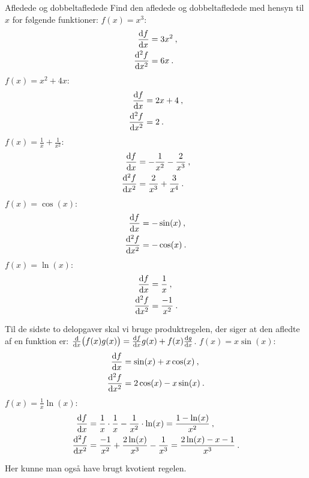 \begin{opgave}[1]{Afledede og dobbeltafledede}
Find den afledede og dobbeltafledede med hensyn til $x$ for følgende funktioner:
\opg $f(x) = x^3$:
    \begin{align*}
        \dv{f}{x}&=3x^2 \: , \\
        \dv[2]{f}{x}&=6x \: .
    \end{align*}
\opg $f(x) = x^2 + 4x$:
    \begin{align*}
        \dv{f}{x}&=2x+4 \: ,\\
        \dv[2]{f}{x}&=2 \: .
    \end{align*}
\opg $f(x) = \frac{1}{x} + \frac{1}{x^2}$:
    \begin{align*}
        \dv{f}{x}&=-\frac{1}{x^2}-\frac{2}{x^3} \: , \\
        \dv[2]{f}{x}&=\frac{2}{x^3}+\frac{3}{x^4} \: .
    \end{align*}
\opg $f(x) = \cos(x)$:
    \begin{align*}
        \dv{f}{x}&=-\sin(x) \: , \\
        \dv[2]{f}{x}&= -\cos(x) \: .
    \end{align*}
\opg $f(x) = \ln(x)$:
    \begin{align*}
        \dv{f}{x}&=\frac{1}{x} \: , \\
        \dv[2]{f}{x}&=\frac{-1}{x^2} \: .
    \end{align*}

Til de sidste to delopgaver skal vi bruge produktregelen, der siger at den afledte af en funktion er: $\dv{}{x}\big(f(x)g(x)\big)=\dv{f}{x}g(x)+f(x)\dv{g}{x}$.
\opg $f(x) = x \sin(x)$:
    \begin{align*}
        \dv{f}{x}&=\sin(x)+x\cos(x) \: , \\
        \dv[2]{f}{x}&=2\cos(x)-x\sin(x) \: .
    \end{align*}
\opg $f(x) = \frac{1}{x} \ln(x)$:
    \begin{align*}
        \dv{f}{x}&=\frac{1}{x}\cdot \frac{1}{x}-\frac{1}{x^2}\cdot \ln(x)=\frac{1-\ln(x)}{x^2} \: , \\
        \dv[2]{f}{x}&=\frac{-1}{x^2}+\frac{2\ln(x)}{x^3}-\frac{1}{x^3}=\frac{2\ln(x)-x-1}{x^3} \: .
    \end{align*}

Her kunne man også have brugt kvotient regelen.
\end{opgave}

